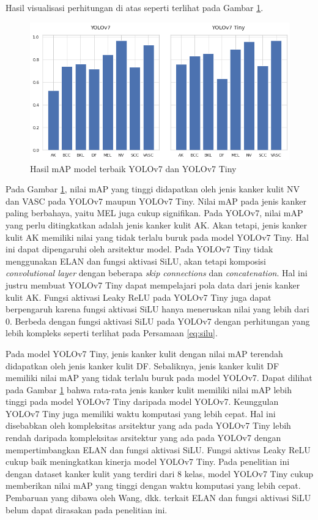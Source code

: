 Hasil visualisasi perhitungan di atas seperti terlihat pada Gambar \ref{fig:d-map}.

\begin{figure}[H]
    \begin{center}
        \includegraphics[width=12cm]{img/bab4/map.png}
        \caption{Hasil mAP model terbaik YOLOv7 dan YOLOv7 Tiny}
        \label{fig:d-map}
    \end{center}
\end{figure}

Pada Gambar \ref{fig:d-map}, nilai mAP yang tinggi didapatkan oleh jenis kanker kulit NV dan VASC pada YOLOv7 maupun YOLOv7 Tiny. Nilai mAP pada jenis kanker paling berbahaya, yaitu MEL juga cukup signifikan. Pada YOLOv7, nilai mAP yang perlu ditingkatkan adalah jenis kanker kulit AK. Akan tetapi, jenis kanker kulit AK memiliki nilai yang tidak terlalu buruk pada model YOLOv7 Tiny. Hal ini dapat dipengaruhi oleh arsitektur model. Pada YOLOv7 Tiny tidak menggunakan ELAN dan fungsi aktivasi SiLU, akan tetapi komposisi \textit{convolutional layer} dengan beberapa \textit{skip connections} dan \textit{concatenation}. Hal ini justru membuat YOLOv7 Tiny dapat mempelajari pola data dari jenis kanker kulit AK. Fungsi aktivasi Leaky ReLU pada YOLOv7 Tiny juga dapat berpengaruh karena fungsi aktivasi SiLU hanya meneruskan nilai yang lebih dari 0. Berbeda dengan fungsi aktivasi SiLU pada YOLOv7 dengan perhitungan yang lebih kompleks seperti terlihat pada Persamaan \ref{eq:silu}. 

Pada model YOLOv7 Tiny, jenis kanker kulit dengan nilai mAP terendah didapatkan oleh jenis kanker kulit DF. Sebaliknya, jenis kanker kulit DF memiliki nilai mAP yang tidak terlalu buruk pada model YOLOv7. Dapat dilihat pada Gambar \ref{fig:d-map} bahwa rata-rata jenis kanker kulit memiliki nilai mAP lebih tinggi pada model YOLOv7 Tiny daripada model YOLOv7. Keunggulan YOLOv7 Tiny juga memiliki waktu komputasi yang lebih cepat. Hal ini disebabkan oleh kompleksitas arsitektur yang ada pada YOLOv7 Tiny lebih rendah daripada kompleksitas arsitektur yang ada pada YOLOv7 dengan mempertimbangkan ELAN dan fungsi aktivasi SiLU. Fungsi aktivas Leaky ReLU cukup baik meningkatkan kinerja model YOLOv7 Tiny. Pada penelitian ini dengan dataset kanker kulit yang terdiri dari 8 kelas, model YOLOv7 Tiny cukup memberikan nilai mAP yang tinggi dengan waktu komputasi yang lebih cepat. Pembaruan yang dibawa oleh Wang, dkk. terkait ELAN dan fungsi aktivasi SiLU belum dapat dirasakan pada penelitian ini.

